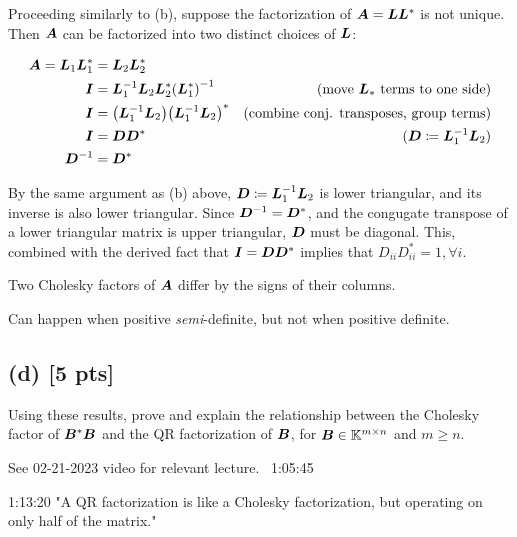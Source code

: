 \documentclass[twoside,10pt]{article}
\begin{document}
Proceeding similarly to (b), suppose the factorization of $\bm{A} = \bm{L} \bm{L}^{*}$ is not unique.
Then $\bm{A}$ can be factorized into two distinct choices of $\bm{L}$:

\begin{align*}
\mtx{A} = \mtx{L}_1\mtx{L}_1^{*} &= \mtx{L}_2\mtx{L}_2^{*}\\
\mtx{I} &= \mtx{L}_1^{-1}\mtx{L}_2\mtx{L}_2^{*}\left(\mtx{L}_1^{*}\right)^{-1} &\text{(move $\mtx{L}_{*}$ terms to one side)}\\
\mtx{I} &= \left(\mtx{L}_1^{-1}\mtx{L}_2\right)\left(\mtx{L}_1^{-1}\mtx{L}_2\right)^{*} &\text{(combine conj. transposes, group terms)}\\
\mtx{I} &= \mtx{D}\mtx{D}^{*} &\text{($\mtx{D} \coloneqq \mtx{L}_1^{-1}\mtx{L}_2$)}\\
\mtx{D}^{-1} &= \mtx{D}^{*}\\
\end{align*}

By the same argument as (b) above, $\bm{D} \coloneqq \bm{L}_1^{-1}\bm{L}_2$ is lower triangular, and its inverse is also lower triangular.
Since $\bm{D}^{-1} = \bm{D}^{*}$, and the congugate transpose of a lower triangular matrix is upper triangular, $\bm{D}$ must be diagonal.
This, combined with the derived fact that $\bm{I} = \bm{D}\bm{D}^{*}$ implies that $D_{ii}D_{ii}^{*} = 1, \forall i.$

Two Cholesky factors of $\bm{A}$ differ by the signs of their columns.

Can happen when positive \textit{semi}-definite, but not when positive definite.

\subsection*{(d) [5 pts]} 
Using these results, prove and explain the relationship between the Cholesky factor of $\bm{B}^* \bm{B}$ and the QR factorization of $\bm{B}$, for $\bm{B} \in \mathbb{K}^{m \times n}$ and $m \geq n$.

See 02-21-2023 video for relevant lecture. ~1:05:45

1:13:20 "A QR factorization is like a Cholesky factorization, but operating on only half of the matrix."
\end{document}

